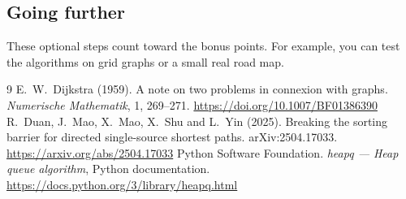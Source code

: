 \documentclass[11pt,a4paper]{article}
\begin{document}
\subsection*{Going further}
These optional steps count toward the bonus points. For example, you can test
the algorithms on grid graphs or a small real road map.

\begin{thebibliography}{9}
   E.~W.~Dijkstra (1959). A note on two problems in
    connexion with graphs. \emph{Numerische Mathematik}, 1, 269--271.
    \url{https://doi.org/10.1007/BF01386390}
   R.~Duan, J.~Mao, X.~Mao, X.~Shu and L.~Yin (2025). Breaking
    the sorting barrier for directed single-source shortest paths.
    arXiv:2504.17033. \url{https://arxiv.org/abs/2504.17033}
   Python Software Foundation. \emph{heapq --- Heap queue
    algorithm}, Python documentation.
    \url{https://docs.python.org/3/library/heapq.html}
\end{thebibliography}
\end{document}
